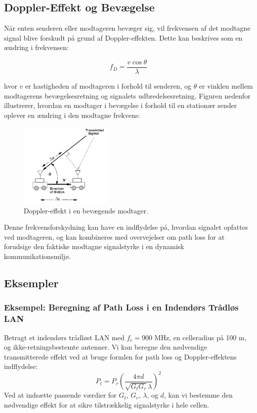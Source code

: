 \documentclass[a4paper,12pt]{book}
\begin{document}
	\subsection{Doppler-Effekt og Bevægelse}
	Når enten senderen eller modtageren bevæger sig, vil frekvensen af det modtagne signal blive forskudt på grund af Doppler-effekten. Dette kan beskrives som en ændring i frekvensen:
	
	\[
	f_D = \frac{v \cos \theta}{\lambda}
	\]
	
	\noindent hvor \( v \) er hastigheden af modtageren i forhold til senderen, og \( \theta \) er vinklen mellem modtagerens bevægelsesretning og signalets udbredelsesretning. 
	\newline\newline\noindent
	Figuren nedenfor illustrerer, hvordan en modtager i bevægelse i forhold til en stationær sender oplever en ændring i den modtagne frekvens:
	
	\begin{figure}[!h]
		\centering
		\includegraphics[width=0.4\textwidth]{fig/fig2.png} %
		\caption{Doppler-effekt i en bevægende modtager.}
	\end{figure}

	\noindent Denne frekvensforskydning kan have en indflydelse på, hvordan signalet opfattes ved modtageren, og kan kombineres med overvejelser om path loss for at forudsige den faktiske modtagne signalstyrke i en dynamisk kommunikationsmiljø.
	
	\subsection{Eksempler}
	\subsubsection{Eksempel: Beregning af Path Loss i en Indendørs Trådløs LAN}
	Betragt et indendørs trådløst LAN med \( f_c = 900 \) MHz, en celleradius på 100 m, og ikke-retningsbestemte antenner. Vi kan beregne den nødvendige transmitterede effekt ved at bruge formlen for path loss og Doppler-effektens indflydelse:
	\[
	P_t = P_r \left( \frac{4\pi d}{\sqrt{G_t G_r} \lambda} \right)^2
	\]
	\noindent Ved at indsætte passende værdier for \( G_t \), \( G_r \), \( \lambda \), og \( d \), kan vi bestemme den nødvendige effekt for at sikre tilstrækkelig signalstyrke i hele cellen.
	
\end{document}
